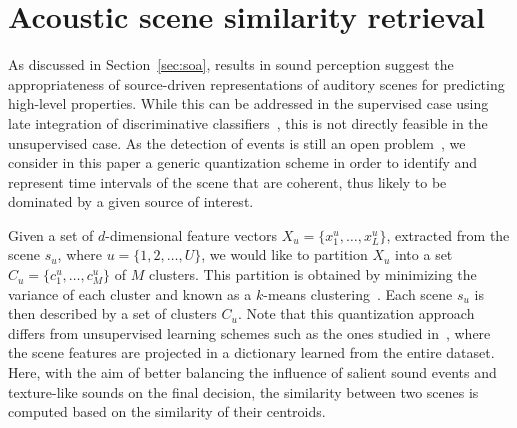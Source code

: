 \documentclass[smallextended]{svjour3}
\begin{document}
\section{Acoustic scene similarity retrieval}
\label{sec:object}



As discussed in Section~\ref{sec:soa}, results in sound perception suggest the appropriateness of source-driven representations of auditory scenes for predicting high-level properties. While this can be addressed in the supervised case using late integration of discriminative classifiers~\cite{Anden2014}, this is not directly feasible in the unsupervised case. As the detection of events is still an open problem~\cite{7100934}, we consider in this paper a generic quantization scheme in order to identify and represent time intervals of the scene that are coherent, thus likely to be dominated by a given source of interest.

Given a set of $d$-dimensional feature vectors $X_u = \{x_1^u, \ldots, x_L^u\}$, extracted from the scene $s_u$, where $u=\lbrace 1,2,\ldots,U\rbrace$, we would like to partition $X_u$ into a set $C_u = \{c^u_1, \ldots, c^u_M\}$ of $M$ clusters. This partition is obtained by minimizing the variance of each cluster and known as a $k$-means clustering~\cite{lloyd}.
Each scene $s_u$ is then described by a set of clusters $C_u$. Note that this quantization approach differs from unsupervised learning schemes such as the ones studied in~\cite{bisot2016acoustic}, where the scene features are projected in a dictionary learned from the entire dataset. Here, with the aim of better balancing the influence of salient sound events and texture-like sounds on the final decision, the similarity between two scenes is computed based on the similarity of their centroids.
\end{document}
